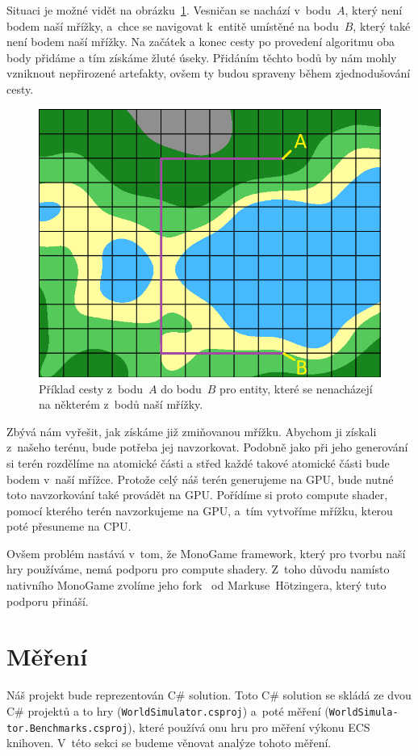 \newpage

Situaci je možné vidět na obrázku~\ref{fig:path_end_points}. Vesničan se nachází v~bodu~$A$, který není bodem naší mřížky, a~chce se navigovat k~entitě umístěné na bodu~$B$, který také není bodem naší mřížky. Na začátek a konec cesty po provedení algoritmu oba body přidáme a tím získáme žluté úseky. Přidáním těchto bodů by nám mohly vzniknout nepřirozené artefakty, ovšem ty budou spraveny během zjednodušování cesty.

\begin{figure}[!htb]
    \centering
    \includegraphics[width=0.66\linewidth]{img/path_end_points.png}
    \caption{Příklad cesty z~bodu~$A$ do bodu~$B$ pro entity, které se nenacházejí na některém z~bodů naší mřížky.}
    \label{fig:path_end_points}
\end{figure}

Zbývá nám vyřešit, jak získáme již zmiňovanou mřížku. Abychom ji získali z~našeho terénu, bude potřeba jej navzorkovat. Podobně jako při jeho generování si terén rozdělíme na atomické části a střed každé takové atomické části bude bodem v~naší mřížce. Protože celý náš terén generujeme na GPU, bude nutné toto navzorkování také provádět na GPU. Pořídíme si proto compute shader, pomocí kterého terén navzorkujeme na GPU, a~tím vytvoříme mřížku, kterou poté přesuneme na CPU.

Ovšem problém nastává v~tom, že MonoGame framework, který pro tvorbu naší hry používáme, nemá podporu pro compute shadery. Z~toho důvodu namísto nativního MonoGame zvolíme jeho fork~\cite{MonoGameCptMax} od Markuse~Hötzingera, který tuto podporu přináší.

\section{Měření}
\label{benchmark-analysis}
Náš projekt bude reprezentován C\# solution. Toto C\# solution se skládá ze dvou C\# projektů a to hry (\texttt{WorldSimulator.csproj}) a~poté měření (\texttt{WorldSimula-} \texttt{tor.Benchmarks.csproj}), které používá onu hru pro měření výkonu ECS knihoven. V~této sekci se budeme věnovat analýze tohoto měření.


